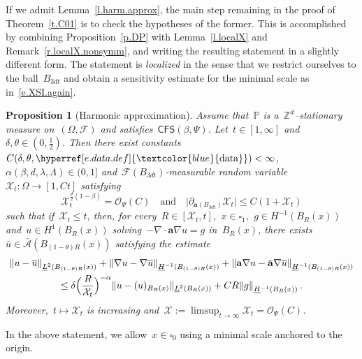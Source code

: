 \documentclass[11pt,twoside]{article} %
\let\oldsquare\square %
\renewcommand{\square}{\oldsquare}
\numberwithin{equation}{section}
\newtheorem{proposition}[theorem]{Proposition}
\theoremstyle{definition}
\newcommand{\dataref}{\hyperref[e.data.def]{\textcolor{blue}{\ensuremath{\mathrm{data}}}}}
\let\originalleft\left
\let\originalright\right
\renewcommand{\left}{\mathopen{}\mathclose\bgroup\originalleft}
\renewcommand{\right}{\aftergroup\egroup\originalright}
\newcommand*{\Zd}{\ensuremath{\mathbb{Z}^d}}
\newcommand{\qand}{\quad \mbox{and} \quad }
\renewcommand{\a}{\mathbf{a}}
\newcommand{\ahom}{\bar{\a}}
\newcommand{\cu}{\square}
\newcommand{\F}{\mathcal{F}}
\renewcommand{\P}{\mathbb{P}}
\newcommand{\X}{\mathcal{X}}
\renewcommand{\O}{\mathcal{O}}
\newcommand{\CFS}{\mathsf{CFS}}
\newcommand{\A}{\mathcal{A}}
\newcommand{\Ahom}{\bar{\A}}
\begin{document}
\smallskip

If we admit Lemma~\ref{l.harm.approx}, the main step remaining in the proof of Theorem~\ref{t.C01} is to check the hypotheses of the former. This is accomplished by combining Proposition~\ref{p.DP} with Lemma~\ref{l.localX} and Remark~\ref{r.localX.nonsymm}, and writing the resulting statement in a slightly different form. The statement is \emph{localized} in the sense that we restrict ourselves to the ball~$B_{3dt}$ and obtain a sensitivity estimate for the minimal scale as in~\eqref{e.XSI.again}. 

\begin{proposition}[Harmonic approximation]
\label{p.harm.we.have}
Assume that~$\P$ is a~$\Zd$--stationary measure on~$(\Omega,\F)$ and satisfies~$\CFS(\beta,\Psi)$. Let~$t \in [1,\infty]$ and~$\delta,\theta \in (0,\frac12)$. Then there exist constants~$C(\delta,\theta,\dataref)<\infty$,~$\alpha(\beta,d,\lambda,\Lambda) \in (0,1]$ and~$\F(B_{3dt})$-measurable random variable 
$\X_t:\Omega \to [1,Ct]$ satisfying
\begin{equation}
\label{e.XSI.again}
\X_t^{\frac d2(1-\beta)} 
= 
\O_{\Psi}(C) 
\qand
\bigl| \partial_{\a(B_{3dt})} \X_t \bigr| \leq C(1 + \X_t) 
\end{equation}
such that if~$\X_t \leq t$, then, for every~$R \in [\X_t,t]$,~$x\in \cu_1$,~$g \in H^{-1}(B_R(x))$ and~$u \in H^1(B_R(x))$ solving~$-\nabla \cdot \a \nabla u = g$ in~$B_R(x)$, there exists~$\bar u  \in \Ahom(B_{(1-\theta)R}(x))$  
satisfying the estimate
\begin{multline}
\label{e.harm.we.have1}
\left\| u - \overline{u}  \right\|_{\underline{L}^2(B_{(1-\theta)R}(x))} 
+
\left\| \nabla u - \nabla \overline{u}  \right\|_{\underline{H}^{-1}(B_{(1-\theta)R}(x))} 
+
\left\| \a \nabla u - \ahom \nabla \overline{u}  \right\|_{\underline{H}^{-1}(B_{(1-\theta)R}(x))} 
\\
\leq 
\delta\Bigl( \frac{R}{\X_t} \Bigr)^{-\alpha} 
\| u - (u)_{B_R(x)}\|_{\underline{L}^{2} \left( B_{R}(x) \right)}
+
CR \left\| g \right\|_{\underline{H}^{-1}(B_R(x))}
\,.
\end{multline}
Moreover,~$t \mapsto \X_t$ is increasing and~$\X := \limsup_{t \to \infty} \X_t = \O_{\Psi}(C)$. 
\end{proposition}

In the above statement, we allow~$x \in \cu_0$ using a minimal scale anchored to the origin. 
\end{document}
